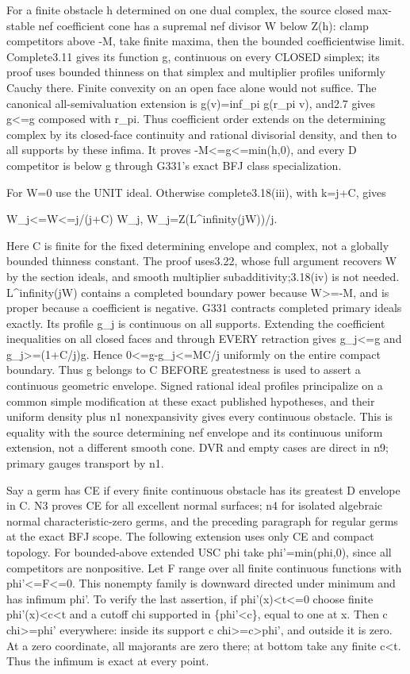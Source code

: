 \documentclass[11pt]{article}
\begin{document}
For a finite obstacle h determined on one dual complex, the source closed max-stable nef coefficient cone has a supremal nef divisor W below Z(h): clamp competitors above -M, take finite maxima, then the bounded coefficientwise limit. Complete3.11 gives its function g, continuous on every CLOSED simplex; its proof uses bounded thinness on that simplex and multiplier profiles uniformly Cauchy there. Finite convexity on an open face alone would not suffice. The canonical all-semivaluation extension is g(v)=inf\_pi g(r\_pi v), and2.7 gives g<=g composed with r\_pi. Thus coefficient order extends on the determining complex by its closed-face continuity and rational divisorial density, and then to all supports by these infima. It proves -M<=g<=min(h,0), and every D competitor is below g through G331's exact BFJ class specialization.

For W=0 use the UNIT ideal. Otherwise complete3.18(iii), with k=j+C, gives

    W\_j<=W<=j/(j+C) W\_j,    W\_j=Z(L\textasciicircum{}infinity(jW))/j.

Here C is finite for the fixed determining envelope and complex, not a globally bounded thinness constant. The proof uses3.22, whose full argument recovers W by the section ideals, and smooth multiplier subadditivity;3.18(iv) is not needed. L\textasciicircum{}infinity(jW) contains a completed boundary power because W>=-M, and is proper because a coefficient is negative. G331 contracts completed primary ideals exactly. Its profile g\_j is continuous on all supports. Extending the coefficient inequalities on all closed faces and through EVERY retraction gives g\_j<=g and g\_j>=(1+C/j)g. Hence 0<=g-g\_j<=MC/j uniformly on the entire compact boundary. Thus g belongs to C BEFORE greatestness is used to assert a continuous geometric envelope. Signed rational ideal profiles principalize on a common simple modification at these exact published hypotheses, and their uniform density plus n1 nonexpansivity gives every continuous obstacle. This is equality with the source determining nef envelope and its continuous uniform extension, not a different smooth cone. DVR and empty cases are direct in n9; primary gauges transport by n1.

Say a germ has CE if every finite continuous obstacle has its greatest D envelope in C. N3 proves CE for all excellent normal surfaces; n4 for isolated algebraic normal characteristic-zero germs, and the preceding paragraph for regular germs at the exact BFJ scope. The following extension uses only CE and compact topology. For bounded-above extended USC phi take phi'=min(phi,0), since all competitors are nonpositive. Let F range over all finite continuous functions with phi'<=F<=0. This nonempty family is downward directed under minimum and has infimum phi'. To verify the last assertion, if phi'(x)<t<=0 choose finite phi'(x)<c<t and a cutoff chi supported in \{phi'<c\}, equal to one at x. Then c chi>=phi' everywhere: inside its support c chi>=c>phi', and outside it is zero. At a zero coordinate, all majorants are zero there; at bottom take any finite c<t. Thus the infimum is exact at every point.
\end{document}
